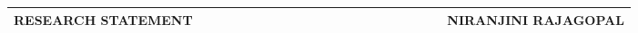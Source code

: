 \documentclass[10pt]{article}
\date{}
\begin{document}


\begin{table}
\color{blue}
\begin{tabular*}{\textwidth}{l r}
\large\textbf{RESEARCH STATEMENT} & 
\hfill \ \ \ \ \ \ \ \ \ \ \ \ \ \ \ \ \ \ \ \
\ \ \ \ \ \ \ \ \ \ \ \ \ 
\large\textbf{NIRANJINI RAJAGOPAL}\\
\hline
\end{tabular*}

\end{table}
 





\end{document}
